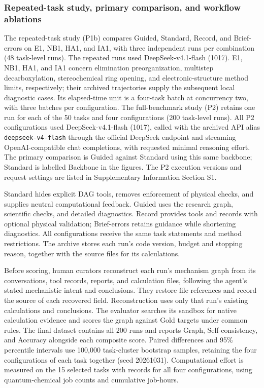 \subsubsection{Repeated-task study, primary comparison, and workflow ablations}

The repeated-task study (P1b) compares Guided, Standard, Record, and Brief-errors on E1, NB1, HA1, and IA1, with three independent runs per combination (48 task-level runs). The repeated runs used DeepSeek-v4.1-flash (1017).\citep{deepseekv42026} E1, NB1, HA1, and IA1 concern elimination preorganization, multistep decarboxylation, stereochemical ring opening, and electronic-structure method limits, respectively; their archived trajectories supply the subsequent local diagnostic cases. Its elapsed-time unit is a four-task batch at concurrency two, with three batches per configuration. The full-benchmark study (P2) retains one run for each of the 50 tasks and four configurations (200 task-level runs). All P2 configurations used DeepSeek-v4.1-flash (1017), called with the archived API alias \texttt{deepseek-v4-flash} through the official DeepSeek endpoint and streaming OpenAI-compatible chat completions, with requested minimal reasoning effort. The primary comparison is Guided against Standard using this same backbone; Standard is labelled Backbone in the figures. The P2 execution versions and request settings are listed in Supplementary Information Section S1.



Standard hides explicit DAG tools, removes enforcement of physical checks, and supplies neutral computational feedback. Guided uses the research graph, scientific checks, and detailed diagnostics. Record provides tools and records with optional physical validation; Brief-errors retains guidance while shortening diagnostics. All configurations receive the same task statements and method restrictions. The archive stores each run's code version, budget and stopping reason, together with the source files for its calculations.



Before scoring, human curators reconstruct each run's mechanism graph from its conversations, tool records, reports, and calculation files, following the agent's stated mechanistic intent and conclusions. They restore file references and record the source of each recovered field. Reconstruction uses only that run's existing calculations and conclusions. The evaluator searches its sandbox for native calculation evidence and scores the graph against Gold targets under common rules. The final dataset contains all 200 runs and reports Graph, Self-consistency, and Accuracy alongside each composite score. Paired differences and 95\% percentile intervals use 100,000 task-cluster bootstrap samples, retaining the four configurations of each task together (seed 20261031). Computational effort is measured on the 15 selected tasks with records for all four configurations, using quantum-chemical job counts and cumulative job-hours.

